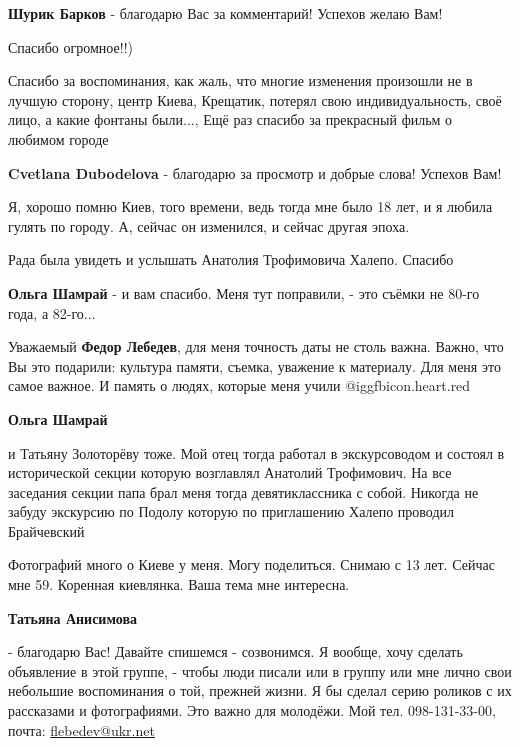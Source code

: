 \begin{itemize}
\textbf{Шурик Барков} - благодарю Вас за комментарий! Успехов желаю Вам!

Спасибо огромное!!)


Спасибо за воспоминания, как жаль, что многие изменения произошли не в лучшую
сторону, центр Киева, Крещатик, потерял свою индивидуальность, своё лицо, а
какие фонтаны были..., Ещё раз спасибо за прекрасный фильм о любимом городе

\textbf{Cvetlana Dubodelova} - благодарю за просмотр и добрые слова! Успехов Вам!


Я, хорошо помню Киев, того времени, ведь тогда мне было 18 лет, и я любила
гулять по городу. А, сейчас он изменился, и сейчас другая эпоха.

Рада была увидеть и услышать Анатолия Трофимовича Халепо. Спасибо

\begin{itemize} %
\textbf{Ольга Шамрай} - и вам спасибо. Меня тут поправили, - это съёмки не 80-го года, а 82-го...


Уважаемый \textbf{Федор Лебедев}, для меня точность даты не столь важна. Важно, что Вы
это подарили: культура памяти, съемка, уважение к материалу. Для меня это
самое важное. И память о людях, которые меня учили @igg{fbicon.heart.red}

\textbf{Ольга Шамрай} 

и Татьяну Золоторёву тоже. Мой отец тогда работал в экскурсоводом и состоял в
исторической секции которую возглавлял Анатолий Трофимович. На все заседания
секции папа брал меня тогда девятиклассника с собой. Никогда не забуду
экскурсию по Подолу которую по приглашению Халепо проводил Брайчевский

\end{itemize} %


Фотографий много о Киеве у меня. Могу поделиться. Снимаю с 13 лет. Сейчас мне
59. Коренная киевлянка. Ваша тема мне интересна.

\begin{itemize} %
\textbf{Татьяна Анисимова} 

- благодарю Вас! Давайте спишемся - созвонимся. Я вообще, хочу сделать
объявление в этой группе, - чтобы люди писали или в группу или мне лично свои
небольшие воспоминания о той, прежней жизни. Я бы сделал серию роликов с их
рассказами и фотографиями. Это важно для молодёжи. Мой тел. 098-131-33-00,
почта: \url{flebedev@ukr.net}


\end{itemize}
\end{itemize}
